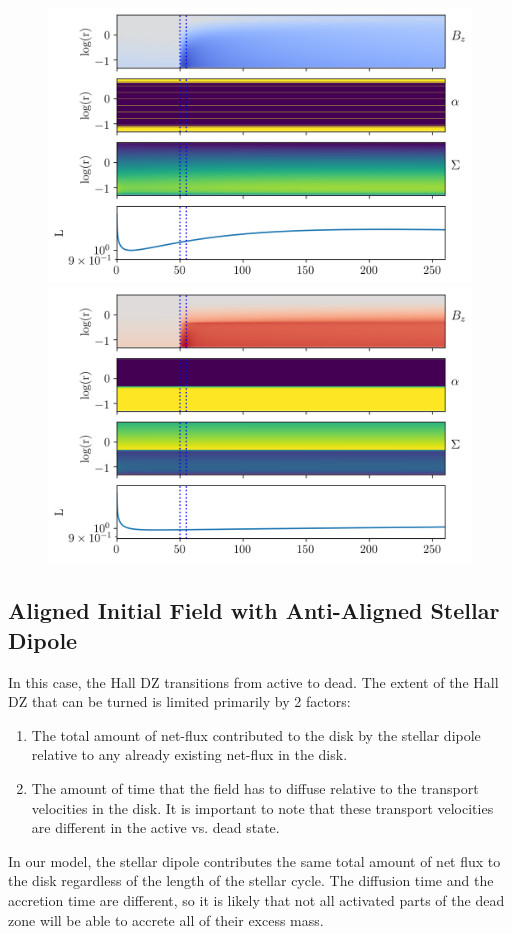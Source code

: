\begin{figure}[p]
\centering
\includegraphics[width=0.7\columnwidth]{figs/figsChapter3/run3113/MST1.png}
\includegraphics[width=0.7\columnwidth]{figs/figsChapter3/run3112/MST1.png}
\caption{}
\label{fiStExample}
\end{figure}

\newpage 
\subsection{Aligned Initial Field with Anti-Aligned Stellar Dipole}
In this case, the Hall DZ transitions from active to dead.  The extent of the Hall DZ that can be turned is limited primarily by 2 factors:
\begin{enumerate}
\item{The total amount of net-flux contributed to the disk by the stellar dipole relative to any already existing net-flux in the disk.}
\item{The amount of time that the field has to diffuse relative to the transport velocities in the disk.  It is important to note that these transport velocities are different in the active vs. dead state. }
\end{enumerate}
In our model, the stellar dipole contributes the same total amount of net flux to the disk regardless of the length of the stellar cycle.  The diffusion time and the accretion time are different, so it is likely that not all activated parts of the dead zone will be able to accrete all of their excess mass.

